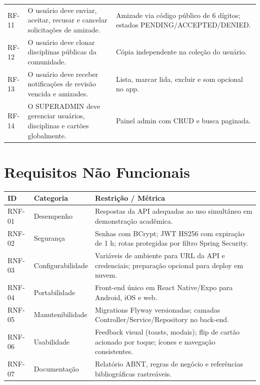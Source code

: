 \begin{quadro}[htb]
\begin{tabular}{p{1.2cm}p{5.5cm}p{5.5cm}}
RF-11 & O usuário deve enviar, aceitar, recusar e cancelar solicitações de amizade. & Amizade via código público de 6 dígitos; estados PENDING/ACCEPTED/DENIED. \\
RF-12 & O usuário deve clonar disciplinas públicas da comunidade. & Cópia independente na coleção do usuário. \\
RF-13 & O usuário deve receber notificações de revisão vencida e amizades. & Lista, marcar lida, excluir e som opcional no app. \\
RF-14 & O SUPERADMIN deve gerenciar usuários, disciplinas e cartões globalmente. & Painel admin com CRUD e busca paginada. \\
\bottomrule
\end{tabular}
\end{quadro}

\section{Requisitos Não Funcionais}

\begin{quadro}[htb]
\caption{Matriz de Requisitos Não Funcionais}
\label{quad:rnf}
\begin{tabular}{p{1.2cm}p{3.5cm}p{7.5cm}}
\toprule
\textbf{ID} & \textbf{Categoria} & \textbf{Restrição / Métrica} \\
\midrule
RNF-01 & Desempenho & Respostas da API adequadas ao uso simultâneo em demonstração acadêmica. \\
RNF-02 & Segurança & Senhas com BCrypt; JWT HS256 com expiração de 1 h; rotas protegidas por filtro Spring Security. \\
RNF-03 & Configurabilidade & Variáveis de ambiente para URL da API e credenciais; preparação opcional para deploy em nuvem. \\
RNF-04 & Portabilidade & Front-end único em React Native/Expo para Android, iOS e web. \\
RNF-05 & Manutenibilidade & Migrations Flyway versionadas; camadas Controller/Service/Repository no back-end. \\
RNF-06 & Usabilidade & Feedback visual (toasts, modais); flip de cartão acionado por toque; ícones e navegação consistentes. \\
RNF-07 & Documentação & Relatório ABNT, regras de negócio e referências bibliográficas rastreáveis. \\
\bottomrule
\end{tabular}
\end{quadro}
